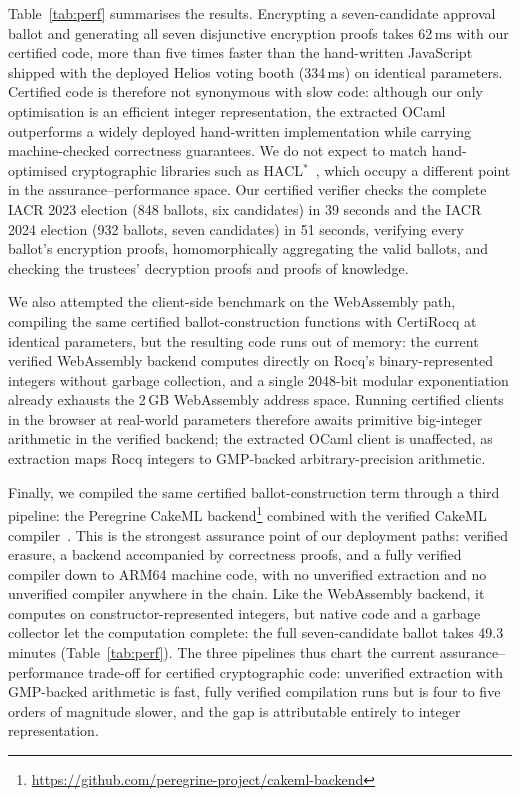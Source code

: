 \documentclass[sigconf,anonymous,review]{acmart}
\begin{document}
Table~\ref{tab:perf} summarises the results. Encrypting a seven-candidate approval ballot and generating all seven disjunctive encryption proofs takes 62\,ms with our certified code, more than five times faster than the hand-written JavaScript shipped with the deployed Helios voting booth (334\,ms) on identical parameters. Certified code is therefore not synonymous with slow code: although our only optimisation is an efficient integer representation, the extracted OCaml outperforms a widely deployed hand-written implementation while carrying machine-checked correctness guarantees. We do not expect to match hand-optimised cryptographic libraries such as HACL$^{*}$~\cite{10.1145/3133956.3134043}, which occupy a different point in the assurance--performance space. Our certified verifier checks the complete IACR 2023 election (848 ballots, six candidates) in 39 seconds and the IACR 2024 election (932 ballots, seven candidates) in 51 seconds, verifying every ballot's encryption proofs, homomorphically aggregating the valid ballots, and checking the trustees' decryption proofs and proofs of knowledge.

We also attempted the client-side benchmark on the WebAssembly path, compiling the same certified ballot-construction functions with CertiRocq at identical parameters, but the resulting code runs out of memory: the current verified WebAssembly backend computes directly on Rocq's binary-represented integers without garbage collection, and a single 2048-bit modular exponentiation already exhausts the 2\,GB WebAssembly address space. Running certified clients in the browser at real-world parameters therefore awaits primitive big-integer arithmetic in the verified backend; the extracted OCaml client is unaffected, as extraction maps Rocq integers to GMP-backed arbitrary-precision arithmetic.

Finally, we compiled the same certified ballot-construction term through a third pipeline: the Peregrine CakeML backend\footnote{\url{https://github.com/peregrine-project/cakeml-backend}} combined with the verified CakeML compiler~\cite{10.1145/2535838.2535841}. This is the strongest assurance point of our deployment paths: verified erasure, a backend accompanied by correctness proofs, and a fully verified compiler down to ARM64 machine code, with no unverified extraction and no unverified compiler anywhere in the chain. Like the WebAssembly backend, it computes on constructor-represented integers, but native code and a garbage collector let the computation complete: the full seven-candidate ballot takes 49.3 minutes (Table~\ref{tab:perf}). The three pipelines thus chart the current assurance--performance trade-off for certified cryptographic code: unverified extraction with GMP-backed arithmetic is fast, fully verified compilation runs but is four to five orders of magnitude slower, and the gap is attributable entirely to integer representation. 
\end{document}
